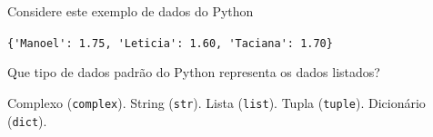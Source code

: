 

{%
\item \rtask \ponto{\pt} 
Considere este exemplo de dados do Python 

\lstinline[style=Python]|{'Manoel': 1.75, 'Leticia': 1.60, 'Taciana': 1.70}|

Que tipo de dados padrão do Python representa os dados listados? 

\begin{answerlist}[label={\texttt{\Alph*}.},leftmargin=*]
    \ti Complexo (\lstinline[style=Python]|complex|). 
    \ti String (\lstinline[style=Python]|str|). 
    \ti Lista (\lstinline[style=Python]|list|).
    \ti Tupla (\lstinline[style=Python]|tuple|).
    \di Dicionário (\lstinline[style=Python]|dict|).
\end{answerlist}
}


